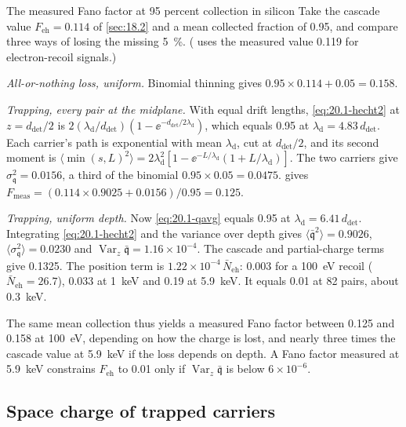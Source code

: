 \begin{workedexample}{The measured Fano factor at 95 percent collection in silicon}\label{we:20-fano}
Take the cascade value $F_{\mathrm{eh}} = 0.114$ of \cref{sec:18.2} and a mean collected fraction of 0.95, and compare three ways of losing the missing \SI{5}{\percent}. ( uses the measured value 0.119 for electron-recoil signals.)

\emph{All-or-nothing loss, uniform.} Binomial thinning gives $0.95 \times 0.114 + 0.05 = 0.158$.

\emph{Trapping, every pair at the midplane.} With equal drift lengths, \cref{eq:20.1-hecht2} at $z = d_{\mathrm{det}}/2$ is $2(\lambda_{\mathrm{d}}/d_{\mathrm{det}})(1 - \ee^{-d_{\mathrm{det}}/2\lambda_{\mathrm{d}}})$, which equals 0.95 at $\lambda_{\mathrm{d}} = 4.83\,d_{\mathrm{det}}$. Each carrier's path is exponential with mean $\lambda_{\mathrm{d}}$, cut at $d_{\mathrm{det}}/2$, and its second moment is $\langle\min(s, L)^2\rangle = 2\lambda_{\mathrm{d}}^2[1 - \ee^{-L/\lambda_{\mathrm{d}}}(1 + L/\lambda_{\mathrm{d}})]$. The two carriers give $\sigma_{\mathfrak{q}}^2 = 0.0156$, a third of the binomial $0.95 \times 0.05 = 0.0475$.  gives $F_{\mathrm{meas}} = (0.114 \times 0.9025 + 0.0156)/0.95 = 0.125$.

\emph{Trapping, uniform depth.} Now \cref{eq:20.1-qavg} equals 0.95 at $\lambda_{\mathrm{d}} = 6.41\,d_{\mathrm{det}}$. Integrating \cref{eq:20.1-hecht2} and the variance over depth gives $\langle\bar{\mathfrak{q}}^2\rangle = 0.9026$, $\langle\sigma_{\mathfrak{q}}^2\rangle = 0.0230$ and $\operatorname{Var}_z\bar{\mathfrak{q}} = 1.16\times10^{-4}$. The cascade and partial-charge terms give 0.1325. The position term is $1.22\times10^{-4}\,\bar N_{\mathrm{eh}}$: 0.003 for a \SI{100}{eV} recoil ($\bar N_{\mathrm{eh}} = 26.7$), 0.033 at \SI{1}{keV} and 0.19 at \SI{5.9}{keV}. It equals 0.01 at 82 pairs, about \SI{0.3}{keV}.

The same mean collection thus yields a measured Fano factor between 0.125 and 0.158 at \SI{100}{eV}, depending on how the charge is lost, and nearly three times the cascade value at \SI{5.9}{keV} if the loss depends on depth. A Fano factor measured at \SI{5.9}{keV} constrains $F_{\mathrm{eh}}$ to 0.01 only if $\operatorname{Var}_z\bar{\mathfrak{q}}$ is below $6\times10^{-6}$.
\end{workedexample}

\subsection{Space charge of trapped carriers}\label{sec:20.1-space}

